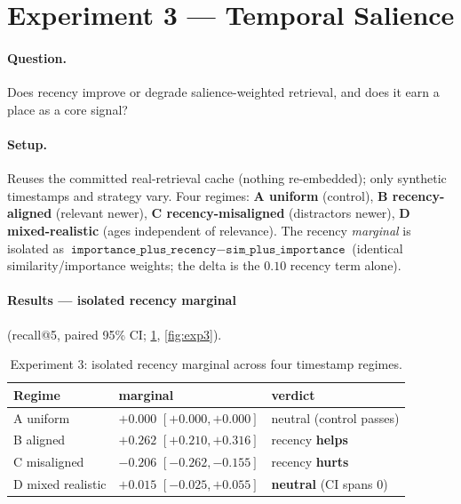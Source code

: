 \documentclass[11pt]{article}
\begin{document}
\section{Experiment 3 --- Temporal Salience}
\label{sec:exp3}

\paragraph{Question.} Does recency improve or degrade salience-weighted retrieval, and does
it earn a place as a core signal?

\paragraph{Setup.} Reuses the committed real-retrieval cache (nothing re-embedded); only
synthetic timestamps and strategy vary. Four regimes: \textbf{A uniform} (control),
\textbf{B recency-aligned} (relevant newer), \textbf{C recency-misaligned} (distractors
newer), \textbf{D mixed-realistic} (ages independent of relevance). The recency
\emph{marginal} is isolated as
$\texttt{importance\_plus\_recency} - \texttt{sim\_plus\_importance}$ (identical
similarity/importance weights; the delta is the $0.10$ recency term alone).

\paragraph{Results --- isolated recency marginal} (recall@5, paired 95\% CI;
\cref{tab:exp3}, \cref{fig:exp3}).

\begin{table}[h]
\centering
\caption{Experiment 3: isolated recency marginal across four timestamp regimes.}
\label{tab:exp3}
\begin{tabular}{lll}
\toprule
Regime & marginal & verdict \\
\midrule
A uniform & $+0.000$ $[+0.000, +0.000]$ & neutral (control passes) \\
B aligned & $+0.262$ $[+0.210, +0.316]$ & recency \textbf{helps} \\
C misaligned & $-0.206$ $[-0.262, -0.155]$ & recency \textbf{hurts} \\
D mixed realistic & $+0.015$ $[-0.025, +0.055]$ & \textbf{neutral} (CI spans 0) \\
\bottomrule
\end{tabular}
\end{table}
\end{document}
